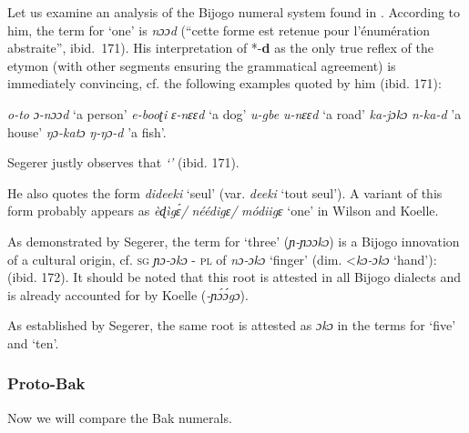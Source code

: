 Let us examine an analysis of the Bijogo numeral system found in \citep{Segerer2002}. According to him, the term for ‘one’ is \textit{nɔɔd} (``cette forme est retenue pour l’énumération abstraite'', ibid.~171). His interpretation of *-\textbf{d} as the only true reflex of the etymon (with other segments ensuring the grammatical agreement) is immediately convincing, cf. the following examples quoted by him (ibid. 171):

\ea
\ea \textit{o-to} \textit{ɔ-nɔɔd} ‘a person’
\ex \textit{e-booʈi} \textit{ɛ-nɛɛd} ‘a dog’
\ex \textit{u-gbe} \textit{u-nɛɛd} ‘a road’
\ex \textit{ka-jɔkɔ} \textit{n-ka-d} ’a house’
\ex \textit{ŋɔ-katɔ} \textit{ŋ-ŋɔ-d} ’a fish’.
\z
\z

Segerer justly observes that \textit{‘}\textit{’} (ibid. 171).

He also quotes the form \textit{dideeki} ‘seul’ (var. \textit{deeki} ‘tout seul’). A variant of this form probably appears as  \textit{èɖìg{\'{ɛ}}/} \textit{néédigɛ/} \textit{módiigɛ} ‘one’ in Wilson and Koelle.

As demonstrated by Segerer, the term for ‘three’ (\textit{ɲ-ɲɔɔkɔ}) is a Bijogo innovation of a cultural origin, cf. \textsc{sg}  \textit{ɲɔ-ɔkɔ} - \textsc{pl} of \textit{nɔ-ɔkɔ} ‘finger’ (dim. <\textit{kɔ-ɔkɔ} ‘hand’): (ibid. 172). It should be noted that this root is attested in all Bijogo dialects and is already accounted for by Koelle (\textit{-ɲ{\'{ɔ}}{\'{ɔ}}gɔ}).

As established by Segerer, the same root is attested as \textit{ɔkɔ} in the terms for ‘five’ and ‘ten’. 

 
\subsubsection{Proto-Bak}%
Now we will compare the Bak numerals.


